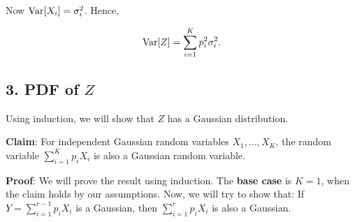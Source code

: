 Now $\text{Var}[X_i] = \sigma_i^2$. Hence,

\begin{equation}
    \text{Var}[Z] = \sum_{i=1}^K p_i^2 \sigma_i^2.
    \label{e5.2}
\end{equation}

\subsection*{3. PDF of $Z$}

Using induction, we will show that $Z$ has a Gaussian distribution.

\textbf{Claim}: For independent Gaussian random variables $X_1, \ldots, X_K$, the
random variable $\sum_{i=1}^{K}p_iX_i$ is also a Gaussian random variable.

\textbf{Proof}: We will prove the result using induction. The \textbf{base case}
is $K=1$, when the claim holds by our assumptions. Now, we will try to show that:
If $Y = \sum_{i=1}^{r-1}p_iX_i$ is a Gaussian, then $\sum_{i=1}^{r}p_iX_i$ is
also a Gaussian.


